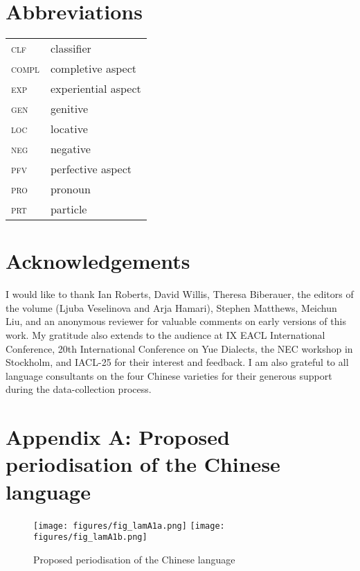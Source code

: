 \documentclass[output=paper]{langscibook}
\begin{document}
\section*{Abbreviations}
\begin{tabularx}{.45\textwidth}{lQ}
\textsc{clf} & classifier\\
\textsc{compl} &	completive aspect\\
\textsc{exp} &	experiential aspect\\ 
\textsc{gen} & 	genitive\\ 
\textsc{loc} &	locative\\
\textsc{neg} &	negative\\ 
\textsc{pfv} &	perfective aspect\\ 
\textsc{pro} &	pronoun\\
\textsc{prt} & 	particle\\ 
\end{tabularx}


\section*{Acknowledgements}

I would like to thank Ian Roberts, David Willis, Theresa Biberauer, the editors of the volume (Ljuba Veselinova and Arja Hamari), Stephen Matthews, Meichun Liu, and an anonymous reviewer for valuable comments on early versions of this work. My gratitude also extends to the audience at IX EACL International Conference, 20th International Conference on Yue Dialects, the NEC workshop in Stockholm, and IACL-25 for their interest and feedback. I am also grateful to all language consultants on the four Chinese varieties for their generous support during the data-collection process. 



\clearpage
\newpage

\section*{Appendix \hypertarget{app:lamA}{A}: Proposed periodisation of the Chinese language}


\begin{figure}[!h] 
    \captionsetup{name=Proposed periodisation of the Chinese language}
    \texttt{[image: figures/fig\_lamA1a.png]}
    \texttt{[image: figures/fig\_lamA1b.png]}
    \caption{Proposed periodisation of the Chinese language}
    \label{fig:periodisation}
\end{figure}
\end{document}
